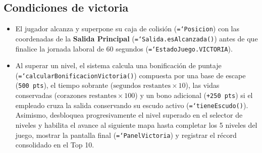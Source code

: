 \documentclass[12pt, a4paper]{article}
\DeclareRobustCommand{\code}[1]{\textcolor{codegreen}{\texttt{\hyphenchar\font=`\-#1}}}
\begin{document}
\subsection{Condiciones de victoria}
\begin{itemize}[leftmargin=1.27cm]
    \item El jugador alcanza y superpone su caja de colisión (\code{Posicion}) con las coordenadas de la \textbf{Salida Principal} (\code{Salida.esAlcanzada()}) antes de que finalice la jornada laboral de 60 segundos (\code{EstadoJuego.VICTORIA}).
    \item Al superar un nivel, el sistema calcula una bonificación de puntaje (\code{calcularBonificacionVictoria()}) compuesta por una base de escape (\texttt{500 pts}), el tiempo sobrante ($\text{segundos restantes} \times 10$), las vidas conservadas ($\text{corazones restantes} \times 100$) y un bono adicional (\texttt{+250 pts}) si el empleado cruza la salida conservando su escudo activo (\code{tieneEscudo()}). Asimismo, desbloquea progresivamente el nivel superado en el selector de niveles y habilita el avance al siguiente mapa hasta completar los 5 niveles del juego, mostrar la pantalla final (\code{PanelVictoria}) y registrar el récord consolidado en el Top 10.
\end{itemize}
\end{document}
